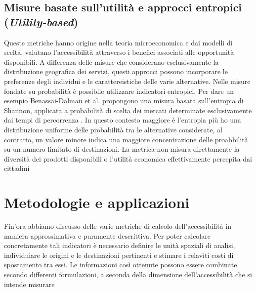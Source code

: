 \subsection{Misure basate sull'utilità e approcci entropici (\textit{Utility-based})}
Queste metriche hanno origine nella teoria microeconomica e dai modelli di scelta, valutano l'accessibilità attraverso i benefici associati alle opportunità disponibili. A differenza delle misure che considerano esclusivamente la distribuzione geografica dei servizi, questi approcci possono incorporare le preferenze degli individui e le carattereistiche delle varie alternative.
Nelle misure fondate su probabilità è possibile utilizzare indicatori entropici. Per dare un esempio Benassai-Dalmau et al. propongono una misura basata sull'entropia di Shannon, applicata a probabilità di scelta dei mercati determinate esclusivamente dai tempi di percorrenza \cite{benassai2026}.
In questo contesto maggiore è l'entropia più ho una distribuzione uniforme delle probabilità tra le alternative considerate, al contrario, un valore minore indica una maggiore concentrazione delle proabbilità su un numero limitato di destinazioni.
La metrica non misura direttamente la diversità dei prodotti disponibili o l'utilità economica effettivamente percepita dai cittadini \cite{benassai2026}

\section{Metodologie e applicazioni}
Fin'ora abbiamo discusso delle varie metriche di calcolo dell'accessibilità in maniera approssimativa e puramente descrittiva.
Per poter calcolare concretamente tali indicatori è necessario definire le unità spaziali di analisi, individuiare le origini e le destinazioni pertinenti e stimare i relaviti costi di spostamento tra essi.
Le informazioni così ottenute possono essere combinate secondo differenti formulazioni, a seconda della dimensione dell'accessibilità che si intende misurare \cite{geurs2004,luo2003}


